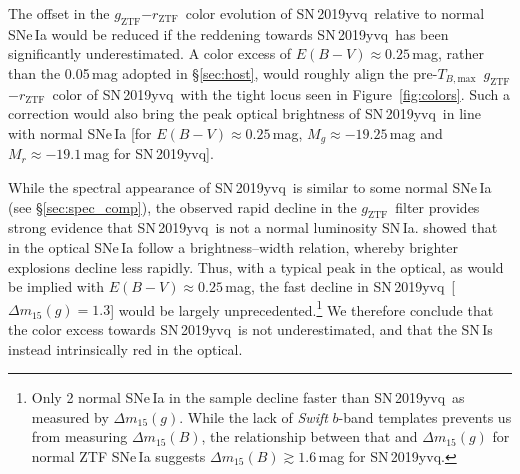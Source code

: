 \documentclass[twocolumn]{aastex63}
\newcommand{\fromkate}[1]{{\color{brown} fromKM: {#1}}}
\newcommand{\frommb}[1]{{\color{purple} fromMB: {#1}}}
\newcommand{\rztf}{$r_\mathrm{ZTF}$}
\newcommand{\gztf}{$g_\mathrm{ZTF}$}
\newcommand{\tbmax}{$T_{B,\mathrm{max}}$}
\newcommand{\sn}{SN\,2019yvq}
\begin{document}
The offset in the \gztf$ - $\rztf\ color evolution of \sn\ relative to normal
SNe\,Ia would be reduced if the reddening towards \sn\ has been significantly
underestimated. A color excess of $E(B-V) \approx 0.25$\,mag, rather than the
0.05\,mag adopted in \S\ref{sec:host}, would roughly align the pre-\tbmax\
\gztf$ - $\rztf\ color of \sn\ with the tight locus seen in
Figure~\ref{fig:colors}. Such a correction would also bring the peak optical
brightness of \sn\ in line with normal SNe\,Ia [for $E(B-V) \approx
0.25$\,mag, $M_g \approx -19.25$\,mag and $M_r \approx -19.1$\,mag for \sn].

While the spectral appearance of \sn\ is similar to some normal SNe\,Ia (see
\S\ref{sec:spec_comp}), the observed rapid decline in the \gztf\ filter
provides strong evidence that \sn\ is not a normal luminosity SN\,Ia.
\citet{Phillips93} showed that in the optical SNe\,Ia follow a
brightness--width relation, whereby brighter explosions decline less rapidly.
Thus, with a typical peak in the optical, as would be implied with $E(B-V)
\approx 0.25$\,mag, the fast decline in \sn\ [$\Delta m_{15}(g) = 1.3$] would
be largely unprecedented.\footnote{Only 2 normal SNe\,Ia in the \citet{Yao19}
sample decline faster than \sn\ as measured by $\Delta m_{15}(g)$. While the
lack of \textit{Swift} $b$-band templates prevents us from measuring $\Delta
m_{15}(B)$, the relationship between that and $\Delta m_{15}(g)$ for normal
ZTF SNe\,Ia suggests $\Delta m_{15}(B) \gtrsim 1.6$\,mag for \sn.} We therefore
conclude that the color excess towards \sn\ is not underestimated, and that
the SN\,Is instead intrinsically red in the optical.


\end{document}
